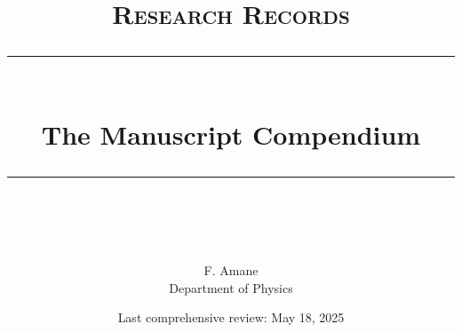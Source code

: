 \usepackage{natbib} 
\usetikzlibrary{cd}
\usepackage{hyperref} %
\makeindex
\let\oldindex\index
\renewcommand{\index}[1]{\oldindex{#1}\marginpar{\hspace{3mm}\small#1}}

\let\oldtextit\textit 
\renewcommand\textit[1]{\oldtextit{\color{blue!60!black}#1}}
\setlength{\parskip}{3pt}
\let\MakeUppercase\relax
\fancyhfinit{\sffamily\bfseries}
\newcommand{\HRule}[1]{\rule{\linewidth}{#1}} 	%

\makeatletter							%
\def\printtitle{%
    {\centering \@title\par}}
\makeatother									

\makeatletter							%
\def\printauthor{%
    {\centering \large \@author}}				
\makeatother

\title{	\normalsize \textsc{Research Records} 	%
		 	\\[3.0cm]								%
			\HRule{0.5pt} \\						%
			\huge {\sffamily The Manuscript Compendium}%
      
			\HRule{1pt} \\ [2.5cm]		%
			\normalsize	\normalfont 		%
		}
\author{
		F. Amane\\ Department of Physics
}
\date{Last comprehensive review: May 18, 2025}
\checkandfixthelayout 

